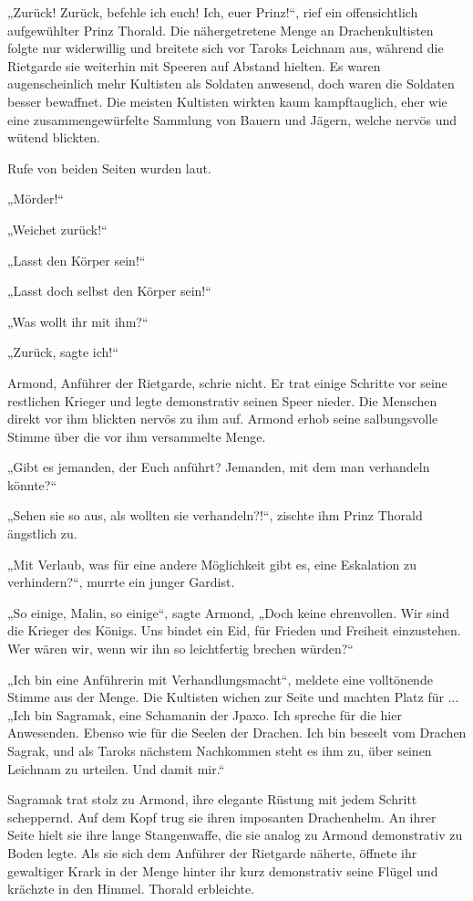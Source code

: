 \trennzeichen



„Zurück! Zurück, befehle ich euch! Ich, euer Prinz!“, rief ein offensichtlich aufgewühlter Prinz Thorald. Die nähergetretene Menge an Drachenkultisten folgte nur widerwillig und breitete sich vor Taroks Leichnam aus, während die Rietgarde sie weiterhin mit Speeren auf Abstand hielten. Es waren augenscheinlich mehr Kultisten als Soldaten anwesend, doch waren die Soldaten besser bewaffnet. Die meisten Kultisten wirkten kaum kampftauglich, eher wie eine zusammengewürfelte Sammlung von Bauern und Jägern, welche nervös und wütend blickten.

Rufe von beiden Seiten wurden laut.

„Mörder!“

„Weichet zurück!“

„Lasst den Körper sein!“

„Lasst doch selbst den Körper sein!“

„Was wollt ihr mit ihm?“

„Zurück, sagte ich!“

Armond, Anführer der Rietgarde, schrie nicht. Er trat einige Schritte vor seine restlichen Krieger und legte demonstrativ seinen Speer nieder. Die Menschen direkt vor ihm blickten nervös zu ihm auf. Armond erhob seine salbungsvolle Stimme über die vor ihm versammelte Menge.

„Gibt es jemanden, der Euch anführt? Jemanden, mit dem man verhandeln könnte?“

„Sehen sie so aus, als wollten sie verhandeln?!“, zischte ihm Prinz Thorald ängstlich zu.

„Mit Verlaub, was für eine andere Möglichkeit gibt es, eine Eskalation zu verhindern?“, murrte ein junger Gardist.

„So einige, Malin, so einige“, sagte Armond, „Doch keine ehrenvollen. Wir sind die Krieger des Königs. Uns bindet ein Eid, für Frieden und Freiheit einzustehen. Wer wären wir, wenn wir ihn so leichtfertig brechen würden?“

„Ich bin eine Anführerin mit Verhandlungsmacht“, meldete eine volltönende Stimme aus der Menge. Die Kultisten wichen zur Seite und machten Platz für ... „Ich bin Sagramak, eine Schamanin der Jpaxo. Ich spreche für die hier Anwesenden. Ebenso wie für die Seelen der Drachen. Ich bin beseelt vom Drachen Sagrak, und als Taroks nächstem Nachkommen steht es ihm zu, über seinen Leichnam zu urteilen. Und damit mir.“

Sagramak trat stolz zu Armond, ihre elegante Rüstung mit jedem Schritt scheppernd. Auf dem Kopf trug sie ihren imposanten Drachenhelm. An ihrer Seite hielt sie ihre lange Stangenwaffe, die sie analog zu Armond demonstrativ zu Boden legte. Als sie sich dem Anführer der Rietgarde näherte, öffnete ihr gewaltiger Krark in der Menge hinter ihr kurz demonstrativ seine Flügel und krächzte in den Himmel. Thorald erbleichte.

